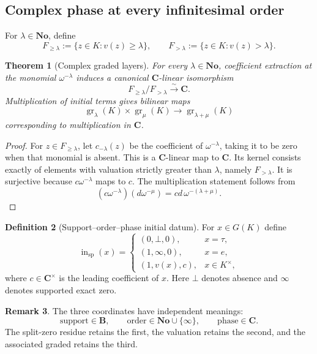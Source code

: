 \documentclass[11pt]{amsart}
\numberwithin{equation}{section}
\newtheorem{theorem}{Theorem}[section]
\theoremstyle{definition}
\newtheorem{definition}[theorem]{Definition}
\newtheorem{remark}[theorem]{Remark}
\newcommand{\B}{\mathbf B}
\newcommand{\C}{\mathbf C}
\newcommand{\No}{\mathbf{No}}
\newcommand{\gr}{\operatorname{gr}}
\begin{document}
\subsection{Complex phase at every infinitesimal order}

For $\lambda\in\No$, define
\[
F_{\ge\lambda}:=\{z\in K:v(z)\ge\lambda\},
\qquad
F_{>\lambda}:=\{z\in K:v(z)>\lambda\}.
\]

\begin{theorem}[Complex graded layers]\label{thm:complex-graded-layers}
For every $\lambda\in\No$, coefficient extraction at the monomial $\omega^{-\lambda}$ induces a canonical $\C$-linear isomorphism
\[
F_{\ge\lambda}/F_{>\lambda}
\xrightarrow{\sim}
\C.
\]
Multiplication of initial terms gives bilinear maps
\[
\gr_\lambda(K)\times\gr_\mu(K)
\longrightarrow
\gr_{\lambda+\mu}(K)
\]
corresponding to multiplication in $\C$.
\end{theorem}

\begin{proof}
For $z\in F_{\ge\lambda}$, let $c_{-\lambda}(z)$ be the coefficient of $\omega^{-\lambda}$, taking it to be zero when that monomial is absent.  This is a $\C$-linear map to $\C$.  Its kernel consists exactly of elements with valuation strictly greater than $\lambda$, namely $F_{>\lambda}$.  It is surjective because $c\omega^{-\lambda}$ maps to $c$.  The multiplication statement follows from
\[
(c\omega^{-\lambda})(d\omega^{-\mu})
=cd\,\omega^{-(\lambda+\mu)}.
\]
\end{proof}

\begin{definition}[Support--order--phase initial datum]\label{def:support-order-phase}
For $x\in G(K)$ define
\[
\operatorname{in}_{\mathrm{sp}}(x)
=
\begin{cases}
(0,\bot,0),&x=\tau,\\
(1,\infty,0),&x=e,\\
(1,v(x),c),&x\in K^\times,
\end{cases}
\]
where $c\in\C^\times$ is the leading coefficient of $x$.  Here $\bot$ denotes absence and $\infty$ denotes supported exact zero.
\end{definition}

\begin{remark}
The three coordinates have independent meanings:
\[
\text{support}\in\B,
\qquad
\text{order}\in\No\cup\{\infty\},
\qquad
\text{phase}\in\C.
\]
The split-zero residue retains the first, the valuation retains the second, and the associated graded retains the third.
\end{remark}
\end{document}
